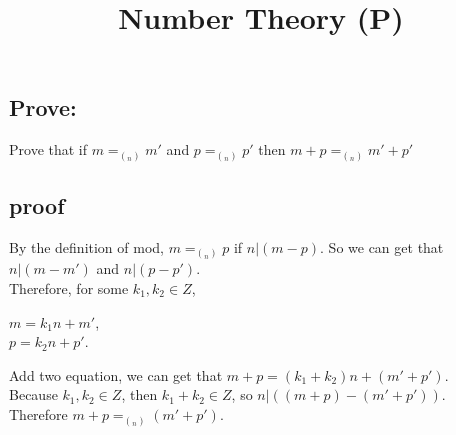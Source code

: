 \documentclass{article}
\title{Number Theory (P)}
\author{}
\date{}
\begin{document}
	\maketitle
	\begin{spacing}{1.5}
		
	\section*{Prove:}
	Prove that if $m = _{(_n)}m'$ and $p = _{(_n)}p'$ then $m+p = _{(_n)}m'+p'$
	
	\subsection*{proof}
	By the definition of mod, $ m = _{(_n)}p$ if $ n|(m-p) $. So we can get that $ n|(m-m') $ and $ n|(p-p') $.\\
	Therefore, for some $ k_1, k_2 \in Z$,
	\begin{center}
		$m=k_1n+m'$,\\
		$p=k_2n+p'$.
	\end{center}
	Add two equation, we can get that $m+p=(k_1+k_2)n+(m'+p')$. \\
	Because $ k_1, k_2 \in Z$, then $ k_1+k_2 \in Z $, so $ n|((m+p)-(m'+p'))$.\\
	Therefore $m+p=_{(_n)}(m'+p')$.
	
	\end{spacing}
\end{document}
